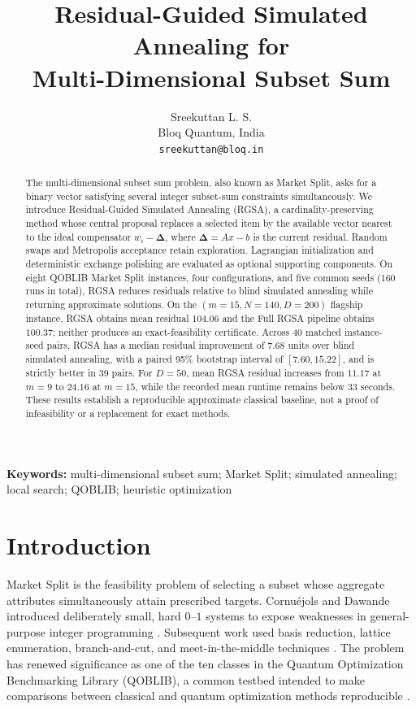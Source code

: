 \documentclass[11pt]{article}
\title{Residual-Guided Simulated Annealing for\\
Multi-Dimensional Subset Sum}
\author{Sreekuttan L. S.\\
Bloq Quantum, India\\
\texttt{sreekuttan@bloq.in}}
\date{}
\newcommand{\res}{\boldsymbol{\Delta}}
\begin{document}
\maketitle

\begin{abstract}
The multi-dimensional subset sum problem, also known as Market Split, asks for a binary vector satisfying several integer subset-sum constraints simultaneously. We introduce Residual-Guided Simulated Annealing (RGSA), a cardinality-preserving method whose central proposal replaces a selected item by the available vector nearest to the ideal compensator $w_i-\res$, where $\res=Ax-b$ is the current residual. Random swaps and Metropolis acceptance retain exploration. Lagrangian initialization and deterministic exchange polishing are evaluated as optional supporting components. On eight QOBLIB Market Split instances, four configurations, and five common seeds (160 runs in total), RGSA reduces residuals relative to blind simulated annealing while returning approximate solutions. On the $(m{=}15,N{=}140,D{=}200)$ flagship instance, RGSA obtains mean residual $104.06$ and the Full RGSA pipeline obtains $100.37$; neither produces an exact-feasibility certificate. Across 40 matched instance-seed pairs, RGSA has a median residual improvement of $7.68$ units over blind simulated annealing, with a paired 95\% bootstrap interval of $[7.60,15.22]$, and is strictly better in 39 pairs. For $D=50$, mean RGSA residual increases from $11.17$ at $m=9$ to $24.16$ at $m=15$, while the recorded mean runtime remains below 33 seconds. These results establish a reproducible approximate classical baseline, not a proof of infeasibility or a replacement for exact methods.
\end{abstract}

\noindent\textbf{Keywords:} multi-dimensional subset sum; Market Split; simulated annealing; local search; QOBLIB; heuristic optimization

\section{Introduction}\label{sec:introduction}
Market Split is the feasibility problem of selecting a subset whose aggregate attributes simultaneously attain prescribed targets. Cornu\'ejols and Dawande introduced deliberately small, hard $0$--$1$ systems to expose weaknesses in general-purpose integer programming \cite{cornuejols1998}. Subsequent work used basis reduction, lattice enumeration, branch-and-cut, and meet-in-the-middle techniques \cite{aardal1999,aardal2000,wassermann2002,wassermann2021,wassermann2026,kempkekoch2026}. The problem has renewed significance as one of the ten classes in the Quantum Optimization Benchmarking Library (QOBLIB), a common testbed intended to make comparisons between classical and quantum optimization methods reproducible \cite{koch2025}.
\end{document}
